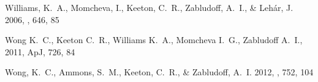 \begin{thebibliography}{99}
{Williams}, K.~A., {Momcheva}, I., {Keeton}, C.~R., {Zabludoff}, A.~I., \&
  {Leh{\'a}r}, J. 2006, \apj, 646, 85


Wong K.~C., Keeton C.~R., Williams K.~A., Momcheva I.~G., Zabludoff A.~I., 
2011, ApJ, 726, 84 


{Wong}, K.~C., {Ammons}, S.~M., {Keeton}, C.~R., \& {Zabludoff}, A.~I. 2012,
  \apj, 752, 104


\end{thebibliography}

